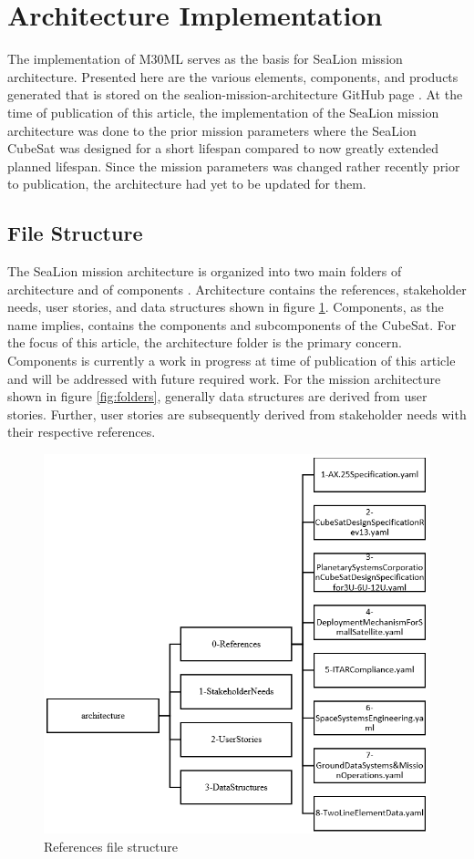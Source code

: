 \documentclass[journal,article,submit,pdftex,moreauthors]{Definitions/mdpi}
\begin{document}
\section{Architecture Implementation}
The implementation of M30ML serves as the basis for SeaLion mission architecture.  Presented here are the various elements, components, and products generated that is stored on the sealion-mission-architecture GitHub page \cite{sealion_mission_architecture}.  At the time of publication of this article, the implementation of the SeaLion mission architecture was done to the prior mission parameters where the SeaLion CubeSat was designed for a short lifespan compared to now greatly extended planned lifespan.  Since the mission parameters was changed rather recently prior to publication, the architecture had yet to be updated for them.

\subsection{File Structure}
The SeaLion mission architecture is organized into two main folders of architecture and of components \cite{sealion_mission_architecture}.  Architecture contains the references, stakeholder needs, user stories, and data structures shown in figure \ref{fig:reference_file}.  Components, as the name implies, contains the components and subcomponents of the CubeSat.  For the focus of this article, the architecture folder is the primary concern.  Components is currently a work in progress at time of publication of this article and will be addressed with future required work.  For the mission architecture shown in figure \ref{fig:folders}, generally data structures are derived from user stories.  Further, user stories are subsequently derived from stakeholder needs with their respective references.

\begin{figure}[H]
    \includegraphics[width=10.5 cm]{assets/reference_file.png}
    \caption{References file structure}
	\label{fig:reference_file}
    \end{figure}   
\unskip
\end{document}
